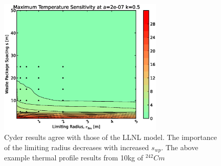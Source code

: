 \begin{figure}[htbp!]
\begin{center}
\includegraphics[width=0.7\textwidth]{./chapters/demonstration/spacing/rs.eps}
\end{center}
\caption[Thermal Sensitivity to $s_{wp}$ and $r_{lim}$ Sensitivity in Cyder]
{Cyder results agree with those of the LLNL model. The importance of the 
limiting radius decreases with increased $s_{wp}$. The above example thermal 
profile results from 10kg of $^{242}Cm$}
\label{fig:rs}
\end{figure}
